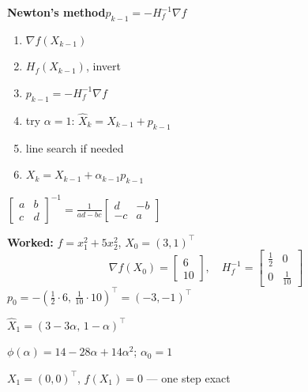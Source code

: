 \documentclass[10pt]{article}
\newlength{\mpw}
\begin{document}
\begin{minipage}[t]{\mpw}\vspace{0pt}
  \textbf{Newton's method}\quad $p_{k-1}=-H_f^{-1}\nabla f$
  \begin{enumerate}\setlength\itemsep{1pt}\setlength\topsep{2pt}
    \item $\nabla f(X_{k-1})$
    \item $H_f(X_{k-1})$, invert
    \item $p_{k-1}=-H_f^{-1}\nabla f$
    \item try $\alpha=1$: $\hat{X}_k=X_{k-1}+p_{k-1}$
    \item line search if needed
    \item $X_k=X_{k-1}+\alpha_{k-1}p_{k-1}$
  \end{enumerate}
  $\begin{bmatrix}a&b\\c&d\end{bmatrix}^{-1}=\frac{1}{ad-bc}\begin{bmatrix}d&-b\\-c&a\end{bmatrix}$

  \smallskip
  \textbf{Worked:} $f=x_1^2+5x_2^2$, $X_0=(3,1)^\top$
  \[
    \nabla f(X_0)=\begin{bmatrix}6\\10\end{bmatrix},\quad
    H_f^{-1}=\begin{bmatrix}\tfrac{1}{2}&0\\0&\tfrac{1}{10}\end{bmatrix}
  \]
  $p_0=-({\tfrac{1}{2}}\cdot6,\,{\tfrac{1}{10}}\cdot10)^\top=(-3,-1)^\top$

  $\hat{X}_1=(3-3\alpha,\,1-\alpha)^\top$

  $\phi(\alpha)=14-28\alpha+14\alpha^2$;\; $\alpha_0=1$

  $X_1=(0,0)^\top$,\; $f(X_1)=0$ — one step exact
\end{minipage}\hfill
\end{document}
